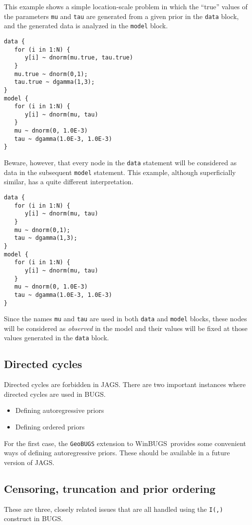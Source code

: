 \documentclass[11pt, a4paper, titlepage]{report}
\newcommand{\JAGS}{\textsf{JAGS}}
\newcommand{\BUGS}{\textsf{BUGS}}
\newcommand{\WinBUGS}{\textsf{WinBUGS}}
\begin{document}
This example shows a simple location-scale problem in which the ``true''
values of the parameters \texttt{mu} and \texttt{tau} are generated
from a given prior in the \texttt{data} block, and the generated
data is analyzed in the \texttt{model} block.
\begin{verbatim}
data {
   for (i in 1:N) {
      y[i] ~ dnorm(mu.true, tau.true) 
   }
   mu.true ~ dnorm(0,1);
   tau.true ~ dgamma(1,3);
}
model {
   for (i in 1:N) {
      y[i] ~ dnorm(mu, tau)
   }
   mu ~ dnorm(0, 1.0E-3)
   tau ~ dgamma(1.0E-3, 1.0E-3)
}
\end{verbatim}
Beware, however, that every node in the \texttt{data} statement will
be considered as data in the subsequent \texttt{model} statement. This
example, although superficially similar, has a quite different interpretation.
\begin{verbatim}
data {
   for (i in 1:N) {
      y[i] ~ dnorm(mu, tau) 
   }
   mu ~ dnorm(0,1);
   tau ~ dgamma(1,3);
}
model {
   for (i in 1:N) {
      y[i] ~ dnorm(mu, tau)
   }
   mu ~ dnorm(0, 1.0E-3)
   tau ~ dgamma(1.0E-3, 1.0E-3)
}
\end{verbatim}
Since the names \texttt{mu} and \texttt{tau} are used in both
\texttt{data} and \texttt{model} blocks, these nodes will be
considered as {\em observed} in the model and their values will be
fixed at those values generated in the \texttt{data} block.

\subsection{Directed cycles}

Directed cycles are forbidden in \JAGS. There are two important
instances where directed cycles are used in \BUGS.
\begin{itemize}
\item Defining autoregressive priors
\item Defining ordered priors
\end{itemize}
For the first case, the \texttt{GeoBUGS} extension to \WinBUGS\ provides
some convenient ways of defining autoregressive priors. These should be
available in a future version of \JAGS.

\subsection{Censoring, truncation and prior ordering}
\label{section:censoring}

These are three, closely related issues that are all handled using
the \texttt{I(,)} construct in \BUGS.
\end{document}

